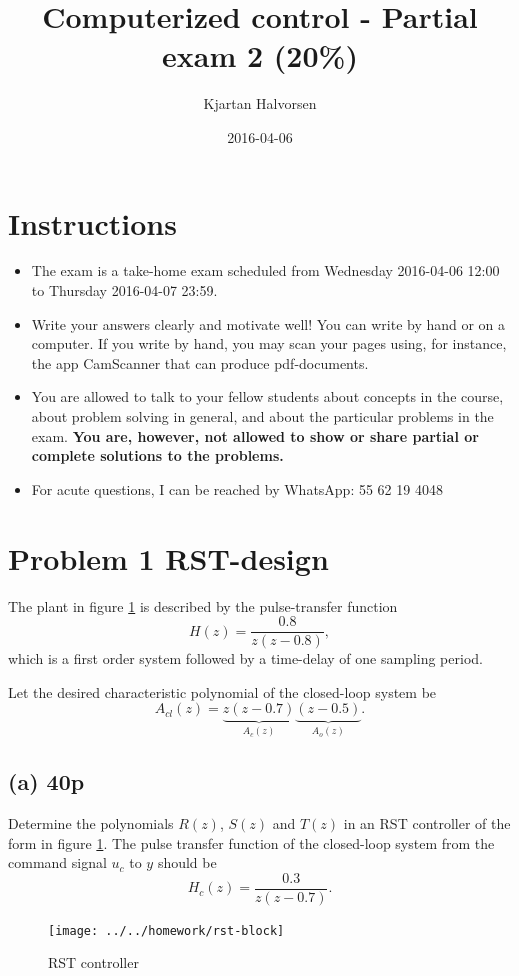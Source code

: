 \documentclass{scrartcl}
\author{Kjartan Halvorsen}
\date{2016-04-06}
\title{Computerized control - Partial exam 2 (20\%)}
\begin{document}
\maketitle

\section*{Instructions}
\label{sec:orgheadline1}
\begin{itemize}
\item The exam is a take-home exam scheduled from Wednesday 2016-04-06 12:00 to Thursday 2016-04-07 23:59.
\item Write your answers clearly and motivate well! You can write by hand or on a computer. If you write by hand, you may scan your pages using, for instance, the app CamScanner that can produce pdf-documents.
\item You are allowed to talk to your fellow students about concepts in the course, about problem solving in general, and about the particular problems in the exam. \textbf{You are, however, not allowed to show or share partial or complete solutions to the problems.}
\item For acute questions, I can be reached by WhatsApp: 55 62 19 4048
\end{itemize}

\section*{Problem 1 RST-design}
\label{sec:orgheadline4}
The plant in figure \ref{fig:2dof} is described by the pulse-transfer function
\begin{equation}
H(z) = \frac{0.8}{z(z-0.8)},
\end{equation}
which is a first order system followed by a time-delay of one sampling period.

Let the desired characteristic polynomial of the closed-loop system be
\begin{equation}
A_{cl}(z) = \underbrace{z(z-0.7)}_{A_c(z)}\underbrace{(z-0.5)}_{A_o(z)}.
\end{equation}

\subsection*{(a) 40p}
\label{sec:orgheadline2}
Determine the polynomials \(R(z)\), \(S(z)\) and \(T(z)\) in an RST controller of the form in figure \ref{fig:2dof}. The pulse transfer function of the closed-loop system from the command signal \(u_c\) to \(y\) should be 
\begin{equation}
H_{c}(z) = \frac{0.3}{z(z-0.7)}.
\end{equation}
\begin{figure}
\begin{center}
\texttt{[image: ../../homework/rst-block]}
\caption{RST controller}
\label{fig:2dof}
\end{center}
\end{figure}
\end{document}
